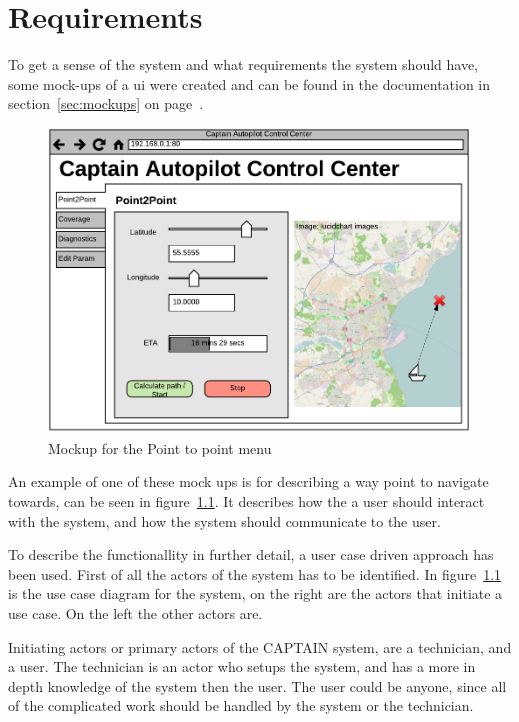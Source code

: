 \chapter{Requirements}
To get a sense of the system and what requirements the system should have, some mock-ups of a ui were created and can be found in the documentation in section~\ref{sec:mockups} on page~\pageref{sec:mockups}.

\begin{figure}[H]
\centering
\includegraphics[width=0.7\linewidth]{../Appendix/Project/Dokumentation/Images/Requirements_specification/UI_Mockup_Point_to_point}
\caption{Mockup for the Point to point menu}
\label{fig:uimockuppointtopoint}
\end{figure}

An example of one of these mock ups is for describing a way point to navigate towards, can be seen in figure~\ref{fig:uimockuppointtopoint}. It describes how the a user should interact with the system, and how the system should communicate to the user.

To describe the functionallity in further detail, a user case driven approach has been used. First of all the actors of the system has to be identified. In figure~\ref{fig:uimockuppointtopoint} is the use case diagram for the system, on the right are the actors that initiate a use case. On the left the other actors are.

Initiating actors or primary actors of the CAPTAIN system, are a technician, and a user. The technician is an actor who setups the system, and has a more in depth knowledge of the system then the user. The user could be anyone, since all of the complicated work should be handled by the system or the technician. 

